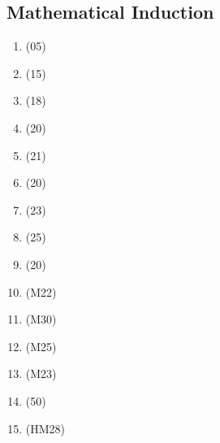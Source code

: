 \documentclass[Main.tex]{subfiles}
\begin{document}
\subsection{Mathematical Induction}
\begin{enumerate}
    \item (05)
    
        
    
    \item (15)
    
        
    
    \item (18)
    
        
    
    \item (20)
    
        
    
    \item (21)
    
        
    
    \item (20)
    
        
    
    \item (23)
    
        
    
    \item (25)
    
        
    
    \item (20)
    
        
    
    \item (M22)
    
        
    
    \item (M30)
    
        
    
    \item (M25)
    
        
    
    \item (M23)
    
        
    
    \item (50)
    
        
    
    \item (HM28)
    
        
    
\end{enumerate}
\end{document}
